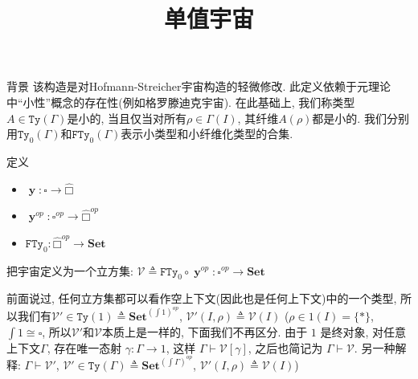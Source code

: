 \documentclass[aspectratio=169,xcolor=dvipsnames]{beamer}
\title{单值宇宙}
\date{}
\newcommand\calV{\mathcal{V}}
\newcommand\FTy{\mathtt{FTy}}
\newcommand\Ty{\mathtt{Ty}}
\newcommand\Set{\mathbf{Set}}
\DeclareMathOperator\y{\mathbf{y}}
\newcommand\cubicalsets{\widehat{□}}
\begin{document}
\begin{frame}
    \titlepage
\end{frame}

\begin{frame}{背景}
该构造是对Hofmann-Streicher宇宙构造的轻微修改. 此定义依赖于元理论中“小性”概念的存在性(例如格罗滕迪克宇宙). 在此基础上, 我们称类型$A\in\Ty(\Gamma)$是小的, 当且仅当对所有$ρ∈Γ(I)$, 其纤维$A(ρ)$都是小的. 我们分别用$\Ty_{0}(\Gamma)$和$\FTy_{0}(\Gamma)$表示小类型和小纤维化类型的合集. 
\end{frame}

\begin{frame}[shrink]{定义}
  \begin{itemize}
    \item $\y:\square\to\cubicalsets$
    \item $\y^{op}:\square^{op}\to\cubicalsets^{op}$
    \item $\FTy_{0}:\cubicalsets^{op}\to\Set$
  \end{itemize}

  把宇宙定义为一个立方集: $\calV \triangleq \FTy_{0}\circ\y^{op} : \square^{op} \to \Set$

  前面说过, 任何立方集都可以看作空上下文(因此也是任何上下文)中的一个类型, 所以我们有$\calV'\in\Ty(1)\triangleq\Set^{(\int1)^{op}}$, $\calV'(I,\rho)\triangleq\calV(I)$ ($\rho\in1(I)=\{\ast\}$, $\int1\cong\square$, 所以$\calV'$和$\calV$本质上是一样的, 下面我们不再区分. 由于 $1$ 是终对象, 对任意上下文$\Gamma$, 存在唯一态射 $\gamma:\Gamma\to1$, 这样 $\Gamma\vdash \calV[\gamma]$, 之后也简记为 $\Gamma\vdash\calV$. 另一种解释: $\Gamma\vdash\calV'$, $\calV'\in\Ty(\Gamma)\triangleq\Set^{(\int\Gamma)^{op}}$, $\calV'(I,\rho)\triangleq\calV(I)$)
\end{frame}

\end{document}
